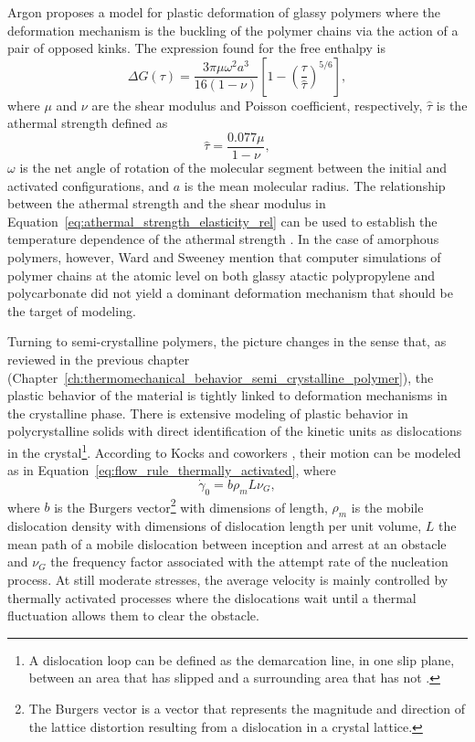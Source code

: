 Argon \citep{argonTheoryLowtemperaturePlastic1973} proposes a model for plastic deformation of glassy polymers where the deformation mechanism is the buckling of the polymer chains via the action of a pair of opposed kinks.
The expression found for the free enthalpy is
\begin{equation}
	\label{eq:argon_model_free_enthalpy}
	\Delta G(\tau)=\frac{3 \pi \mu \omega^2 a^3}{16(1-\nu)}\left[1-\left(\frac{\tau}{\hat \tau}\right)^{5 / 6}\right],
\end{equation}
where $\mu$ and $\nu$ are the shear modulus and Poisson coefficient, respectively, $\hat \tau$ is the athermal strength defined as
\begin{equation}
  \label{eq:athermal_strength_elasticity_rel}
	\hat \tau = \frac{0.077 \mu}{1-\nu},
\end{equation}
$\omega$ is the net angle of rotation of the molecular segment between the initial and activated configurations, and $a$ is the mean molecular radius.
The relationship between the athermal strength and the shear modulus in Equation~\eqref{eq:athermal_strength_elasticity_rel} can be used to establish the temperature dependence of the athermal strength \citep{haoUnifiedAmorphousCrystalline2022}.
In the case of amorphous polymers, however, Ward and Sweeney \citep{wardIntroductionMechanicalProperties2004} mention that computer simulations of polymer chains at the atomic level on both glassy atactic polypropylene and polycarbonate did not yield a dominant deformation mechanism that should be the target of modeling.

Turning to semi-crystalline polymers, the picture changes in the sense that, as reviewed in the previous chapter (Chapter~\ref{ch:thermomechanical_behavior_semi_crystalline_polymer}), the plastic behavior of the material is tightly linked to deformation mechanisms in the crystalline phase.
There is extensive modeling of plastic behavior in polycrystalline solids with direct identification of the kinetic units as dislocations in the crystal\footnote{A dislocation loop can be defined as the demarcation line, in one slip plane, between an area that has slipped and a surrounding area that has not \citep{kocks1975thermodynamics}.}.
According to Kocks and coworkers \citep{kocks1975thermodynamics}, their motion can be modeled as in Equation~\eqref{eq:flow_rule_thermally_activated}, where
\begin{equation}
	\label{eq:pre_exponential_def}
	\dot \gamma_0 = b\rho_m L \nu_G,
\end{equation}
where $b$ is the Burgers vector\footnote{The Burgers vector is a vector that represents the magnitude and direction of the lattice distortion resulting from a dislocation in a crystal lattice.} with dimensions of length, $\rho_m$ is the mobile dislocation density with dimensions of dislocation length per unit volume, $L$ the mean path of a mobile dislocation between inception and arrest at an obstacle and $\nu_G$ the frequency factor associated with the attempt rate of the nucleation process.
At still moderate stresses, the average velocity is mainly controlled by thermally activated processes where the dislocations wait until a thermal fluctuation allows them to clear the obstacle.

